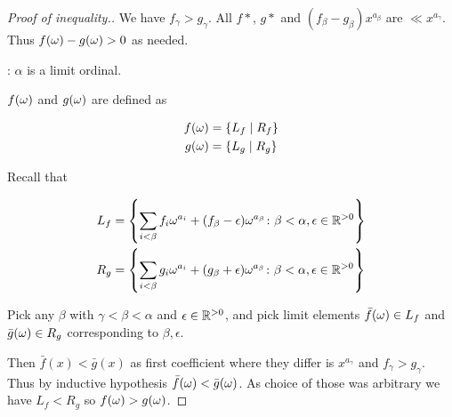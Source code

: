\begin{proof}[Proof of inequality.]
We have $f_\gamma > g_\gamma$.
All $f*$, $g*$ and $(f_\beta - g_\beta) x^{a_\beta}$ are  $\ll x^{a_\gamma}$.
Thus $f(\omega) - g(\omega) > 0$ as needed.

: $\alpha$ is a limit ordinal.

$f(\omega)$ and $g(\omega)$ are defined as 

\begin{align*}
  f(\omega) &= \left\{ L_f \mid R_f \right\} \\
  g(\omega) &= \left\{ L_g \mid R_g \right\}
\end{align*}

Recall that

\begin{align*}
  L_f &= \left\{ \sum_{i < \beta} f_i \omega^{a_i} + (f_\beta - \epsilon) \omega^{a_\beta}
	\colon \beta < \alpha, \epsilon \in \mathbb{R}^{>0} \right\} \\
  R_g &= \left\{ \sum_{i < \beta} g_i \omega^{a_i} + (g_\beta + \epsilon) \omega^{a_\beta}
	\colon \beta < \alpha, \epsilon \in \mathbb{R}^{>0} \right\}
\end{align*}

Pick any $\beta$ with $\gamma < \beta < \alpha$ and $\epsilon \in \mathbb{R}^{>0}$,
and pick limit elements $\bar f(\omega) \in L_f$ and $\bar g(\omega) \in R_g$ corresponding to $\beta, \epsilon$.

Then $\bar f(x) < \bar g(x)$ as first coefficient where they differ is $x^{a_\gamma}$ and $f_\gamma > g_\gamma$.
Thus by inductive hypothesis $\bar f(\omega) < \bar g(\omega)$.
As choice of those was arbitrary we have $L_f < R_g$ so $f(\omega) > g(\omega)$.
\end{proof}

